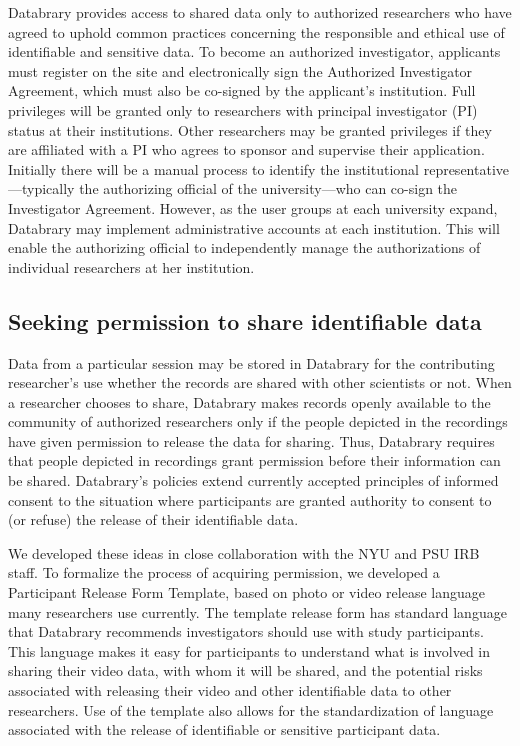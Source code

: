 \documentclass{sig-alternate}
\begin{document}
Databrary provides access to shared data only to authorized researchers
who have agreed to uphold common practices concerning the responsible
and ethical use of identifiable and sensitive data. To become an
authorized investigator, applicants must register on the site and
electronically sign the Authorized Investigator Agreement, which must
also be co-signed by the applicant’s institution. Full privileges will
be granted only to researchers with principal investigator (PI) status
at their institutions. Other researchers may be granted privileges if
they are affiliated with a PI who agrees to sponsor and supervise their
application. Initially there will be a manual process to identify the
institutional representative—typically the authorizing official of the
university—who can co-sign the Investigator Agreement. However, as the
user groups at each university expand, Databrary may implement
administrative accounts at each institution. This will enable the
authorizing official to independently manage the authorizations of
individual researchers at her institution.

\subsection{Seeking permission to share identifiable data}

Data from a particular session may be stored in Databrary for the
contributing researcher’s use whether the records are shared with other
scientists or not. When a researcher chooses to share, Databrary makes
records openly available to the community of authorized researchers only
if the people depicted in the recordings have given permission to
release the data for sharing. Thus, Databrary requires that people
depicted in recordings grant permission before their information can be
shared. Databrary’s policies extend currently accepted principles of
informed consent to the situation where participants are granted
authority to consent to (or refuse) the release of their identifiable
data.

We developed these ideas in close collaboration with the NYU and PSU IRB
staff. To formalize the process of acquiring permission, we developed a
Participant Release Form Template, based on photo or video release
language many researchers use currently. The template release form has
standard language that Databrary recommends investigators should use
with study participants. This language makes it easy for participants to
understand what is involved in sharing their video data, with whom it
will be shared, and the potential risks associated with releasing their
video and other identifiable data to other researchers. Use of the
template also allows for the standardization of language associated with
the release of identifiable or sensitive participant data.
\end{document}
